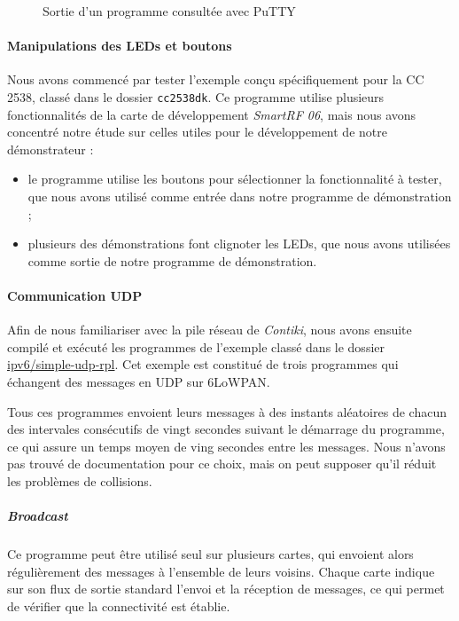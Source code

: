 \begin{figure}[H]
\centering
{}
\caption{Sortie d’un programme consultée avec \emph{}PuTTY}
\label{putty}
\end{figure}

\paragraph{Manipulations des LEDs et boutons}

Nous avons commencé par tester l’exemple conçu spécifiquement pour la CC 2538, classé dans le dossier \texttt{cc2538dk}.
Ce programme utilise plusieurs fonctionnalités de la carte de développement \emph{SmartRF 06}, mais nous avons concentré notre étude sur celles utiles pour le développement de notre démonstrateur :

\begin{itemize}
	\item le programme utilise les boutons pour sélectionner la fonctionnalité à tester, que nous avons utilisé comme entrée dans notre programme de démonstration ;
	\item plusieurs des démonstrations font clignoter les LEDs, que nous avons utilisées comme sortie de notre programme de démonstration.
\end{itemize}

\paragraph{Communication UDP}

Afin de nous familiariser avec la pile réseau de \emph{Contiki}, nous avons ensuite compilé et exécuté les programmes de l’exemple classé dans le dossier \url{ipv6/simple-udp-rpl}.
Cet exemple est constitué de trois programmes qui échangent des messages en UDP sur 6LoWPAN.

Tous ces programmes envoient leurs messages à des instants aléatoires de chacun des intervales consécutifs de vingt secondes suivant le démarrage du programme, ce qui assure un temps moyen de ving secondes entre les messages.
Nous n’avons pas trouvé de documentation pour ce choix, mais on peut supposer qu’il réduit les problèmes de collisions.

\subparagraph{\textit{Broadcast}}

Ce programme peut être utilisé seul sur plusieurs cartes, qui envoient alors régulièrement des messages à l’ensemble de leurs voisins.
Chaque carte indique sur son flux de sortie standard l’envoi et la réception de messages, ce qui permet de vérifier que la connectivité est établie.

